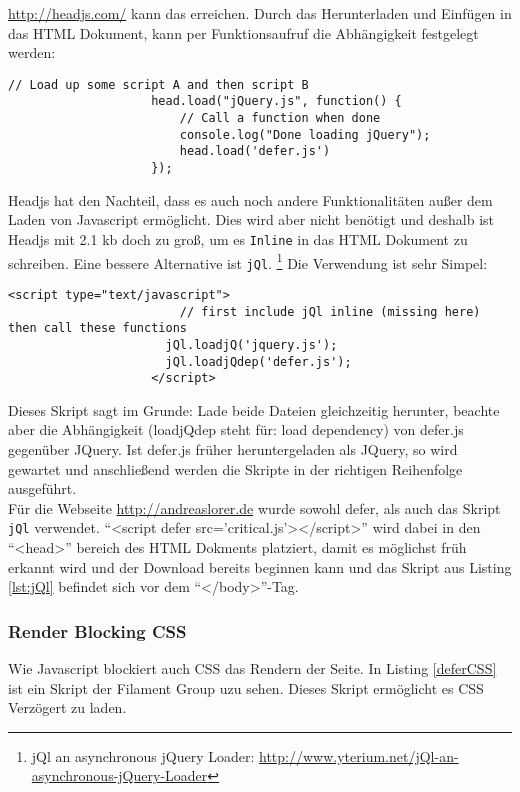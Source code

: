 				\url{http://headjs.com/} kann das erreichen. Durch das Herunterladen und Einfügen in das HTML Dokument, kann per Funktionsaufruf die Abhängigkeit festgelegt werden:

				\begin{lstlisting}[captionpos=b, caption=Headjs dependency loading (Listing nach http://headjs.com/), label=lst:headjs]
					// Load up some script A and then script B
					head.load("jQuery.js", function() {
					    // Call a function when done
					    console.log("Done loading jQuery");
					    head.load('defer.js')
					});
				\end{lstlisting}

				Headjs hat den Nachteil, dass es auch noch andere Funktionalitäten außer dem Laden von Javascript ermöglicht. Dies wird aber nicht benötigt und deshalb ist Headjs mit 2.1 kb doch zu groß, um es \texttt{Inline} in das HTML Dokument zu schreiben. Eine bessere Alternative ist \texttt{jQl}. \footnote{jQl an asynchronous jQuery Loader: \url{http://www.yterium.net/jQl-an-asynchronous-jQuery-Loader}}
				Die Verwendung ist sehr Simpel:

				\begin{lstlisting}[captionpos=b, caption=jQl asynchronous jQuery-Loader, label=lst:jQl]
					<script type="text/javascript">
						// first include jQl inline (missing here) then call these functions
					  jQl.loadjQ('jquery.js');
					  jQl.loadjQdep('defer.js');
					</script>
				\end{lstlisting}

				Dieses Skript sagt im Grunde: Lade beide Dateien gleichzeitig herunter, beachte aber die Abhängigkeit (loadjQdep steht für: load dependency) von defer.js gegenüber JQuery. Ist defer.js früher heruntergeladen als JQuery, so wird gewartet und anschließend werden die Skripte in der richtigen Reihenfolge ausgeführt.\\

				Für die Webseite \url{http://andreaslorer.de} wurde sowohl defer, als auch das Skript \texttt{jQl} verwendet. "`<script defer src='critical.js'></script>"' wird dabei in den "`<head>"' bereich des HTML Dokments platziert, damit es möglichst früh erkannt wird und der Download bereits beginnen kann und das Skript aus Listing \ref{lst:jQl} befindet sich vor dem "`</body>"'-Tag.

				\pagebreak


			\subsubsection{Render Blocking CSS} %
			\label{ssub:render_blocking_css}
				Wie Javascript blockiert auch CSS das Rendern der Seite. In Listing \ref{deferCSS} ist ein Skript der Filament Group uzu sehen. Dieses Skript ermöglicht es CSS Verzögert zu laden. 

